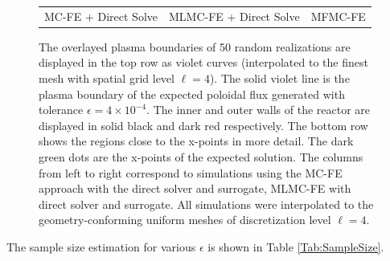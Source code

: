 \begin{figure}[ht!]
\begin{tabular}{ccc}
\\[1ex]
\quad MC-FE + Direct Solve &MLMC-FE + Direct Solve &MFMC-FE  \\[-0.5ex]
\end{tabular}
\caption{The overlayed plasma boundaries of 50 random realizations are 
displayed in the top row as violet curves (interpolated to the finest mesh with spatial grid level $\ell=4$). The solid violet line is the plasma boundary of the expected 
poloidal flux generated with tolerance $\epsilon=4\times 10^{-4}$. 
The inner and outer walls of the reactor are displayed in solid black and 
dark red respectively. The bottom row shows the regions close to the 
x-points in more detail. The dark green dots are the x-points of the expected 
solution. The columns from left to right correspond to simulations using the 
MC-FE approach with the direct solver and surrogate, MLMC-FE with direct 
solver and surrogate. All simulations were interpolated to the geometry-conforming uniform meshes of discretization level $\ell=4$.} 
\label{fig:QoI_plot}
\end{figure}
%





The sample size estimation for various $\epsilon$ is shown in Table \ref{Tab:SampleSize}.


